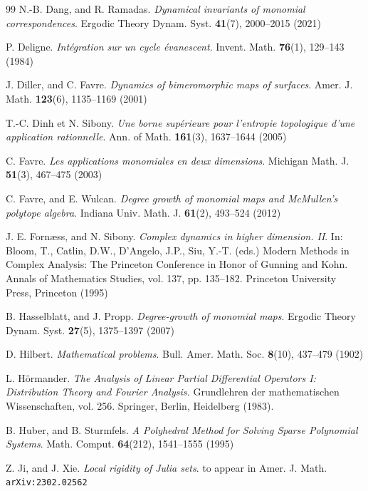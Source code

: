 \documentclass[11pt,a4paper]{article}
\theoremstyle{plain}
\theoremstyle{remark}
\theoremstyle{custombold}
\begin{document}
\begin{thebibliography}{99}
 N.-B. Dang, and R. Ramadas. \textit{Dynamical invariants of monomial correspondences}. Ergodic Theory Dynam. Syst. \textbf{41}(7), 2000--2015 (2021)


 P. Deligne. \textit{Int\'egration sur un cycle \'evanescent}. Invent. Math. \textbf{76}(1), 129--143 (1984)

 J. Diller, and C. Favre. \textit{Dynamics of bimeromorphic maps of surfaces}. Amer. J. Math. \textbf{123}(6), 1135--1169 (2001)

 T.-C. Dinh et N. Sibony. \textit{Une borne sup\'erieure pour l’entropie topologique d’une application rationnelle}. Ann. of Math. \textbf{161}(3), 1637--1644 (2005)

 C. Favre. \textit{Les applications monomiales en deux dimensions}. Michigan Math. J. \textbf{51}(3), 467--475 (2003)


 C. Favre, and E. Wulcan. \textit{Degree growth of monomial maps and McMullen’s polytope algebra}. Indiana Univ. Math. J. \textbf{61}(2), 493--524 (2012)

 J. E. Forn{\ae}ss, and N. Sibony. \textit{Complex dynamics in higher dimension. II}. In: Bloom, T., Catlin, D.W., D'Angelo, J.P., Siu, Y.-T. (eds.) Modern Methods in Complex Analysis: The Princeton Conference in Honor of Gunning and Kohn. Annals of Mathematics Studies, vol. 137, pp. 135--182. Princeton University Press, Princeton (1995)

 B. Hasselblatt, and J. Propp. \textit{Degree-growth of monomial maps}. Ergodic Theory Dynam. Syst. \textbf{27}(5), 1375--1397 (2007)


 D. Hilbert. \textit{Mathematical problems}. Bull. Amer. Math. Soc. \textbf{8}(10), 437--479 (1902)

 L. H\"{o}rmander. \textit{The Analysis of Linear Partial Differential Operators I: Distribution Theory and Fourier Analysis.} Grundlehren der mathematischen Wissenschaften, vol. 256. Springer, Berlin, Heidelberg (1983).


 B. Huber, and B. Sturmfels. \textit{A Polyhedral Method for Solving Sparse Polynomial Systems}. Math. Comput. \textbf{64}(212), 1541--1555 (1995)


 Z. Ji, and J. Xie. \textit{Local rigidity of Julia sets}.  to appear in Amer. J. Math. \texttt{arXiv:2302.02562}



\end{thebibliography}
\end{document}
